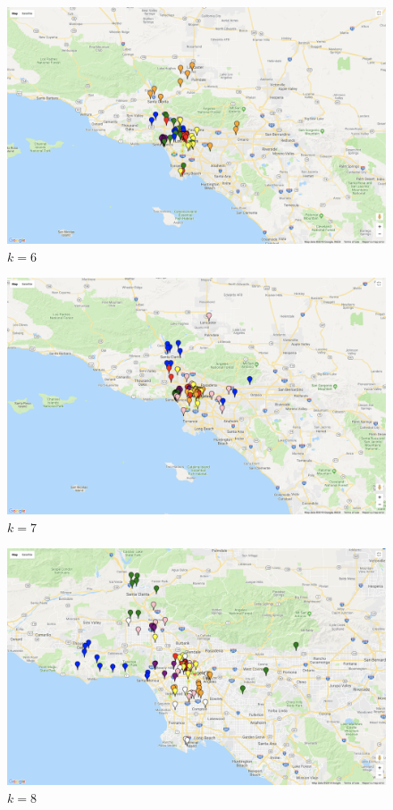 \documentclass[11pt,letterpaper]{article}
\begin{document}
\begin{subfigures}
\begin{figure}[H]\centering
  \includegraphics[width=\linewidth, height=0.4\textheight]{k=6.png}
  \caption{$k=6$}
\end{figure}
%
\begin{figure}[H]\centering
  \includegraphics[width=\linewidth, height=0.4\textheight]{k=7.png}
  \caption{$k=7$}
\end{figure}
%
\begin{figure}[H]
  \includegraphics[width=\linewidth, height=0.4\textheight]{k=8.png}
  \caption{$k=8$}
\end{figure}
\end{subfigures}
\end{document}

